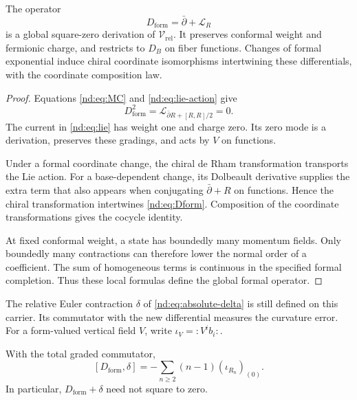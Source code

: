 \begin{theorem}\label{nd:thm:formal}
The operator
\begin{equation}\label{nd:eq:Dform}
 D_{\mathrm{form}}=\bar\partial+\mathcal L_R
\end{equation}
is a global square-zero derivation of $\mathcal V_{\mathrm{rel}}$.
It preserves conformal weight and fermionic charge, and restricts to
$D_B$ on fiber functions. Changes of formal exponential induce chiral
coordinate isomorphisms intertwining these differentials, with the
coordinate composition law.
\end{theorem}

\begin{proof}
Equations \eqref{nd:eq:MC} and \eqref{nd:eq:lie-action} give
\[
 D_{\mathrm{form}}^2
   =\mathcal L_{\bar\partial R+[R,R]/2}=0.
\]
The current in \eqref{nd:eq:lie} has weight one and charge zero.
Its zero mode is a derivation, preserves these gradings, and acts by
$V$ on functions.

Under a formal coordinate change, the chiral de Rham
transformation transports the Lie action. For a base-dependent change,
its Dolbeault derivative supplies the extra term that also appears
when conjugating $\bar\partial+R$ on functions. Hence the chiral
transformation intertwines \eqref{nd:eq:Dform}. Composition of the
coordinate transformations gives the cocycle identity.

At fixed conformal weight, a state has boundedly many momentum fields.
Only boundedly many contractions can therefore lower the normal order
of a coefficient. The sum of homogeneous terms is continuous in the
specified formal completion. Thus these local formulas define the
global formal operator.
\end{proof}

The relative Euler contraction $\delta$ of
\eqref{nd:eq:absolute-delta} is still defined on this carrier. Its
commutator with the new differential measures the curvature error.
For a form-valued vertical field $V$, write
$\iota_V=:V^ib_i:$.

\begin{proposition}\label{nd:prop:curvature}
With the total graded commutator,
\begin{equation}\label{nd:eq:curvature}
 [D_{\mathrm{form}},\delta]
   =-\sum_{n\geq2}(n-1)(\iota_{R_n})_{(0)}.
\end{equation}
In particular, $D_{\mathrm{form}}+\delta$ need not square to zero.
\end{proposition}

